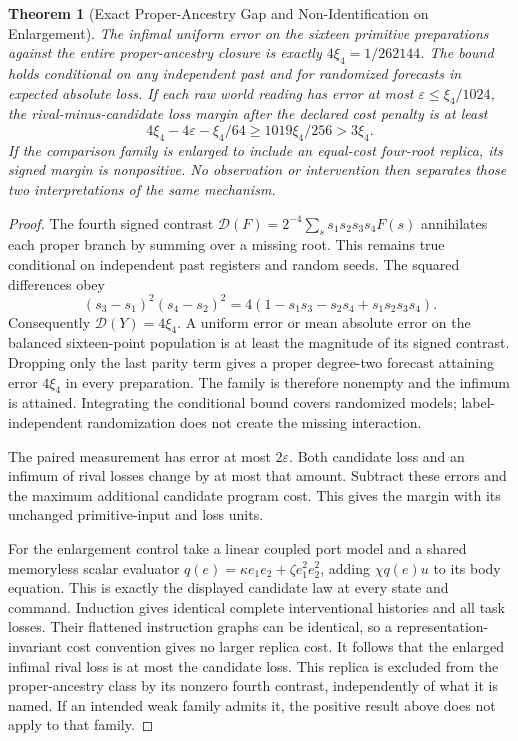 \documentclass[11pt,a4paper]{article}
\newtheorem{theorem}{Theorem}[section]
\theoremstyle{definition}
\begin{document}
\begin{theorem}[Exact Proper-Ancestry Gap and Non-Identification on Enlargement]
\label{thm:bridge-four-root-identification}
The infimal uniform error on the sixteen primitive preparations against the
entire proper-ancestry closure is exactly $4\xi_4=1/262144$. The bound holds
conditional on any independent past and for randomized forecasts in expected
absolute loss. If each raw world reading has error at most
$\varepsilon\le\xi_4/1024$, the rival-minus-candidate loss margin after
the declared cost penalty is at least
\[
 4\xi_4-4\varepsilon-\xi_4/64\ge1019\xi_4/256>3\xi_4.
\]
If the comparison family is enlarged to include an equal-cost four-root
replica, its signed margin is nonpositive. No observation or intervention
then separates those two interpretations of the same mechanism.
\end{theorem}
\begin{proof}
The fourth signed contrast
$\mathcal D(F)=2^{-4}\sum_s s_1s_2s_3s_4 F(s)$ annihilates each proper
branch by summing over a missing root. This remains true conditional on
independent past registers and random seeds. The squared differences obey
\[
 (s_3-s_1)^2(s_4-s_2)^2
 =4(1-s_1s_3-s_2s_4+s_1s_2s_3s_4).
\]
Consequently $\mathcal D(Y)=4\xi_4$. A uniform error or mean absolute error
on the balanced sixteen-point population is at least the magnitude of its
signed contrast. Dropping only the last parity term gives a proper
degree-two forecast attaining error $4\xi_4$ in every preparation. The
family is therefore nonempty and the infimum is attained. Integrating the
conditional bound covers randomized models; label-independent randomization
does not create the missing interaction.

The paired measurement has error at most $2\varepsilon$. Both candidate
loss and an infimum of rival losses change by at most that amount. Subtract
these errors and the maximum additional candidate program cost. This gives
the margin with its unchanged primitive-input and loss units.

For the enlargement control take a linear coupled port model and a shared
memoryless scalar evaluator
$q(e)=\kappa e_1e_2+\zeta e_1^2e_2^2$, adding $\chi q(e)u$ to its body
equation. This is exactly the displayed candidate law at every state and
command. Induction gives identical complete interventional histories and
all task losses. Their flattened instruction graphs can be identical, so a
representation-invariant cost convention gives no larger replica cost.
It follows that the enlarged infimal rival loss is at most the candidate
loss. This replica is excluded from the proper-ancestry class by its
nonzero fourth contrast, independently of what it is named. If an intended
weak family admits it, the positive result above does not apply to that family.
\end{proof}
\end{document}
